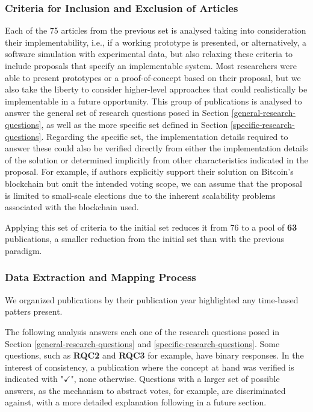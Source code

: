 \documentclass[../access.tex]{subfiles}
\begin{document}
\subsubsection{Criteria for Inclusion and Exclusion of Articles}
Each of the 75 articles from the previous set is analysed taking into consideration their implementability, i.e., if a working prototype is presented, or alternatively, a software simulation with experimental data, but also relaxing these criteria to include proposals that specify an implementable system. Most researchers were able to present prototypes or a proof-of-concept based on their proposal, but we also take the liberty to consider higher-level approaches that could realistically be implementable in a future opportunity. This group of publications is analysed to answer the general set of research questions posed in Section \ref{general-research-questions}, as well as the more specific set defined in Section \ref{specific-research-questions}. Regarding the specific set, the implementation details required to answer these could also be verified directly from either the implementation details of the solution or determined implicitly from other characteristics indicated in the proposal. For example, if authors explicitly support their solution on Bitcoin's blockchain but omit the intended voting scope, we can assume that the proposal is limited to small-scale elections due to the inherent scalability problems associated with the blockchain used.
\par
Applying this set of criteria to the initial set reduces it from 76 to a pool of \textbf{63} publications, a smaller reduction from the initial set than with the previous paradigm.

\subsubsection{Data Extraction and Mapping Process}
We organized publications by their publication year highlighted any time-based patters present.
\par
The following analysis answers each one of the research questions posed in Section \ref{general-research-questions} and \ref{specific-research-questions}. Some questions, such as \textbf{RQC2} and \textbf{RQC3} for example, have binary responses. In the interest of consistency, a publication where the concept at hand was verified is indicated with "$ \checkmark $", none otherwise. Questions with a larger set of possible answers, as the mechanism to abstract votes, for example, are discriminated against, with a more detailed explanation following in a future section.
\end{document}
